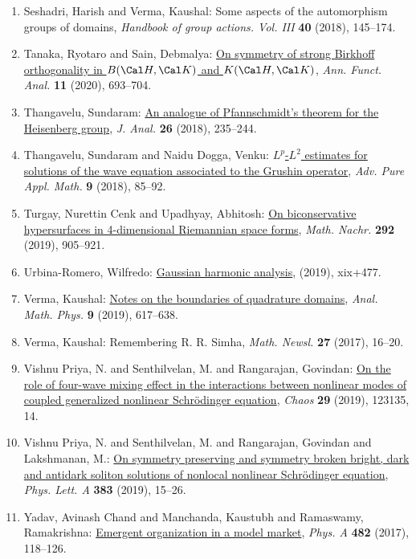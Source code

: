 \begin{enumerate}
\item Seshadri, Harish and Verma, Kaushal: Some aspects of the automorphism groups of domains, \emph{Handbook of group actions. {V}ol. {III}} {\bf 40} (2018), 145--174.
\item Tanaka, Ryotaro and Sain, Debmalya: \href{https://doi.org/10.1007/s43034-019-00048-7}{On symmetry of strong {B}irkhoff orthogonality in {$B(\Cal
H,\Cal K)$} and {$K(\Cal H,\Cal K)$}}, \emph{Ann. Funct. Anal.} {\bf 11} (2020), 693--704.
\item Thangavelu, Sundaram: \href{https://doi.org/10.1007/s41478-018-0147-9}{An analogue of {P}fannschmidt's theorem for the {H}eisenberg
group}, \emph{J. Anal.} {\bf 26} (2018), 235--244.
\item Thangavelu, Sundaram and Naidu Dogga, Venku: \href{https://doi.org/10.1515/apam-2017-0042}{{$L^p$}-{$L^2$} estimates for solutions of the wave equation
associated to the {G}rushin operator}, \emph{Adv. Pure Appl. Math.} {\bf 9} (2018), 85--92.
\item Turgay, Nurettin Cenk and Upadhyay, Abhitosh: \href{https://doi.org/10.1002/mana.201700328}{On biconservative hypersurfaces in 4-dimensional {R}iemannian
space forms}, \emph{Math. Nachr.} {\bf 292} (2019), 905--921.
\item Urbina-Romero, Wilfredo: \href{https://doi.org/10.1007/978-3-030-05597-4}{Gaussian harmonic analysis}, \emph{} {\bf } (2019), xix+477.
\item Verma, Kaushal: \href{https://doi.org/10.1007/s13324-018-0221-0}{Notes on the boundaries of quadrature domains}, \emph{Anal. Math. Phys.} {\bf 9} (2019), 617--638.
\item Verma, Kaushal: Remembering {R}. {R}. {S}imha, \emph{Math. Newsl.} {\bf 27} (2017), 16--20.
\item Vishnu Priya, N. and Senthilvelan, M. and Rangarajan,
Govindan: \href{https://doi.org/10.1063/1.5121245}{On the role of four-wave mixing effect in the interactions
between nonlinear modes of coupled generalized nonlinear
{S}chr\"{o}dinger equation}, \emph{Chaos} {\bf 29} (2019), 123135, 14.
\item Vishnu Priya, N. and Senthilvelan, M. and Rangarajan, Govindan
and Lakshmanan, M.: \href{https://doi.org/10.1016/j.physleta.2018.10.011}{On symmetry preserving and symmetry broken bright, dark and
antidark soliton solutions of nonlocal nonlinear {S}chr\"{o}dinger
equation}, \emph{Phys. Lett. A} {\bf 383} (2019), 15--26.
\item Yadav, Avinash Chand and Manchanda, Kaustubh and Ramaswamy,
Ramakrishna: \href{https://doi.org/10.1016/j.physa.2017.04.029}{Emergent organization in a model market}, \emph{Phys. A} {\bf 482} (2017), 118--126.
\end{enumerate}

